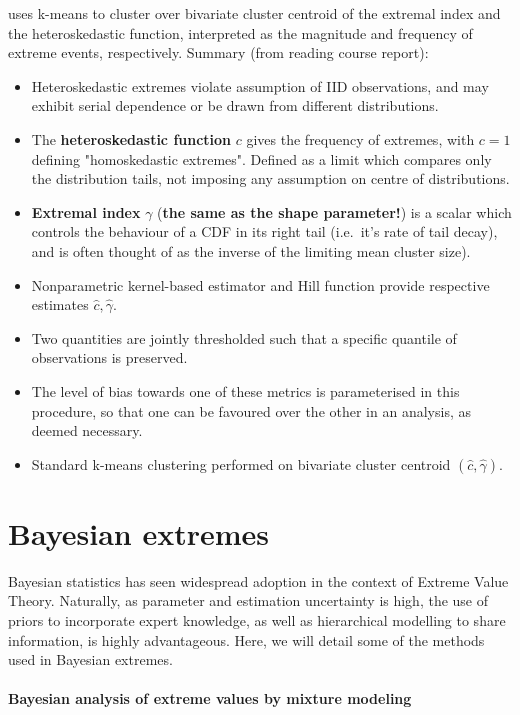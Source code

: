 \documentclass{article}
\numberwithin{equation}{section}
\begin{document}
\cite{deCarvalho2023} uses k-means to cluster over bivariate cluster centroid of the extremal index and the heteroskedastic function, interpreted as the magnitude and frequency of extreme events, respectively. 
Summary (from reading course report):
\begin{itemize}
  \item Heteroskedastic extremes violate assumption of IID observations, and may exhibit serial dependence or be drawn from different distributions. 
  \item The \textbf{heteroskedastic function} $c$ gives the frequency of extremes, with $c = 1$ defining "homoskedastic extremes". 
  Defined as a limit which compares only the distribution tails, not imposing any assumption on centre of distributions. 
  \item \textbf{Extremal index} $\gamma$ (\textbf{the same as the shape parameter!}) is a scalar which controls the behaviour of a CDF in its right tail (i.e.\ it's rate of tail decay), and is often thought of as the inverse of the limiting mean cluster size).
  \item Nonparametric kernel-based estimator and Hill function provide respective estimates $\hat{c}, \hat{\gamma}$.
  \item Two quantities are jointly thresholded such that a specific quantile of observations is preserved. 
  \item The level of bias towards one of these metrics is parameterised in this procedure, so that one can be favoured over the other in an analysis, as deemed necessary. 
  \item Standard k-means clustering performed on bivariate cluster centroid $(\hat{c}, \hat{\gamma})$.
\end{itemize}

\newpage
\section{Bayesian extremes}

Bayesian statistics has seen widespread adoption in the context of Extreme Value Theory. 
Naturally, as parameter and estimation uncertainty is high, the use of priors to incorporate expert knowledge, as well as hierarchical modelling to share information, is highly advantageous.
Here, we will detail some of the methods used in Bayesian extremes.

\paragraph{Bayesian analysis of extreme values by mixture modeling}
\end{document}
